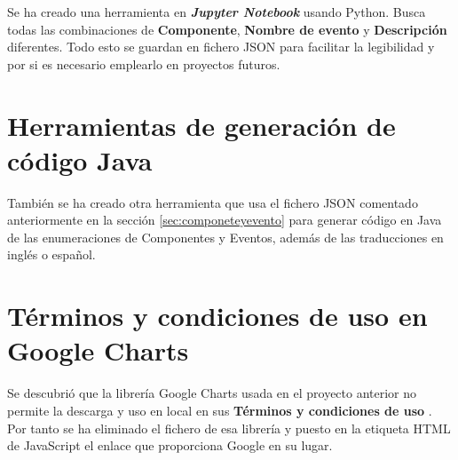 Se ha creado una herramienta en \textbf{\textit{Jupyter Notebook}} usando Python. Busca todas las combinaciones de \textbf{Componente}, \textbf{Nombre de evento} y \textbf{Descripción} diferentes. Todo esto se guardan en fichero JSON para facilitar la legibilidad y por si es necesario emplearlo en proyectos futuros.


\section{Herramientas de generación de código Java}

También se ha creado otra herramienta que usa el fichero JSON comentado anteriormente en la sección \ref{sec:componeteyevento} para generar código en Java de las enumeraciones de Componentes y Eventos, además de las traducciones en inglés o español.

\section{Términos y condiciones de uso en Google Charts}
Se descubrió que la librería Google Charts usada en el proyecto anterior no permite la descarga y uso en local en sus \textbf{Términos y condiciones de uso} \cite{noauthor_frequently_nodate}. Por tanto se ha eliminado el fichero de esa librería y puesto en la etiqueta HTML de JavaScript el enlace que proporciona Google \cite{noauthor_quick_nodate} en su lugar.
